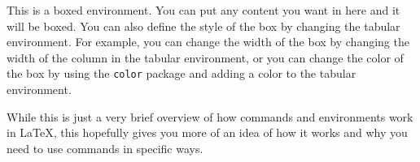 \documentclass{article}
\begin{document}
\begin{myboxed}
    This is a boxed environment. You can put any content you want in here and it will be boxed. You can also define the style of the box by changing the tabular environment. For example, you can change the width of the box by changing the width of the column in the tabular environment, or you can change the color of the box by using the \texttt{color} package and adding a color to the tabular environment.
\end{myboxed}

While this is just a very brief overview of how commands and environments work in LaTeX, this hopefully gives you more of an idea of how it works and why you need to use commands in specific ways.
\end{document}
